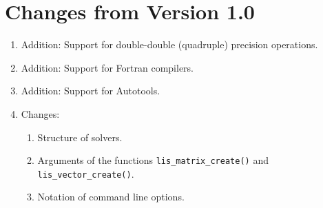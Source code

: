\documentclass[a4paper]{article}
\begin{document}
\section*{Changes from Version 1.0}
\begin{enumerate}
\item Addition: Support for double-double (quadruple) precision operations.
\item Addition: Support for Fortran compilers.
\item Addition: Support for Autotools.
\item Changes: 
\begin{enumerate}
\item Structure of solvers.
\item Arguments of the functions {\tt lis\_matrix\_create()} and {\tt lis\_vector\_create()}.
\item Notation of command line options.
\end{enumerate}
\end{enumerate}
\end{document}
